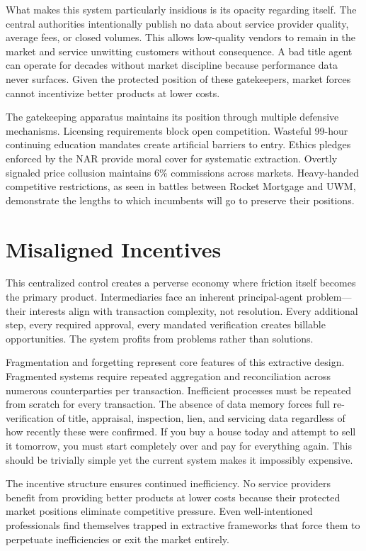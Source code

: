 What makes this system particularly insidious is its opacity regarding itself. The central authorities intentionally publish no data about service provider quality, average fees, or closed volumes. This allows low-quality vendors to remain in the market and service unwitting customers without consequence. A bad title agent can operate for decades without market discipline because performance data never surfaces. Given the protected position of these gatekeepers, market forces cannot incentivize better products at lower costs.

The gatekeeping apparatus maintains its position through multiple defensive mechanisms. Licensing requirements block open competition. Wasteful 99-hour continuing education mandates create artificial barriers to entry. Ethics pledges enforced by the NAR provide moral cover for systematic extraction. Overtly signaled price collusion maintains 6\% commissions across markets. Heavy-handed competitive restrictions, as seen in battles between Rocket Mortgage and UWM, demonstrate the lengths to which incumbents will go to preserve their positions.

\section{Misaligned Incentives}

This centralized control creates a perverse economy where friction itself becomes the primary product. Intermediaries face an inherent principal-agent problem---their interests align with transaction complexity, not resolution. Every additional step, every required approval, every mandated verification creates billable opportunities. The system profits from problems rather than solutions.

Fragmentation and forgetting represent core features of this extractive design. Fragmented systems require repeated aggregation and reconciliation across numerous counterparties per transaction. Inefficient processes must be repeated from scratch for every transaction. The absence of data memory forces full re-verification of title, appraisal, inspection, lien, and servicing data regardless of how recently these were confirmed. If you buy a house today and attempt to sell it tomorrow, you must start completely over and pay for everything again. This should be trivially simple yet the current system makes it impossibly expensive.

The incentive structure ensures continued inefficiency. No service providers benefit from providing better products at lower costs because their protected market positions eliminate competitive pressure. Even well-intentioned professionals find themselves trapped in extractive frameworks that force them to perpetuate inefficiencies or exit the market entirely.

